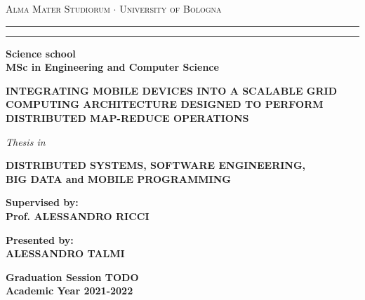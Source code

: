 \begin{titlepage}
    \begin{center}
    {{\Large{
        \textsc{Alma Mater Studiorum $\cdot$ University of Bologna}
    }}}
    \rule[0.1cm]{15.8cm}{0.1mm}
    \rule[0.5cm]{15.8cm}{0.6mm}
    {\small{\bf Science school\\ 
    MSc in Engineering and Computer Science }}
    \vspace{15mm}
    \end{center}
    \begin{center}
        \huge\bf INTEGRATING MOBILE DEVICES INTO A SCALABLE GRID COMPUTING ARCHITECTURE DESIGNED TO PERFORM DISTRIBUTED MAP-REDUCE OPERATIONS
    \end{center}
    \vspace{15mm}
    \begin{center}
    {{\emph{Thesis in}}}
    
    \vspace{1mm}
    {{\bf{DISTRIBUTED SYSTEMS, SOFTWARE ENGINEERING,\\BIG DATA and MOBILE PROGRAMMING}}}
    \vspace{18mm}
    \end{center}
    \par
    \noindent
    \begin{minipage}[t]{0.47\textwidth}
    {\large{\bf Supervised by:\\
    Prof. ALESSANDRO RICCI}}
    \end{minipage}
    \hfill
    \begin{minipage}[t]{0.47\textwidth}\raggedleft
    {\large{\bf Presented by:\\
    ALESSANDRO TALMI}}
    \end{minipage}
    \vspace{20mm}
    \begin{center}
    {\large{\bf Graduation Session TODO\\
    Academic Year 2021-2022}}
    \end{center}
\end{titlepage}
